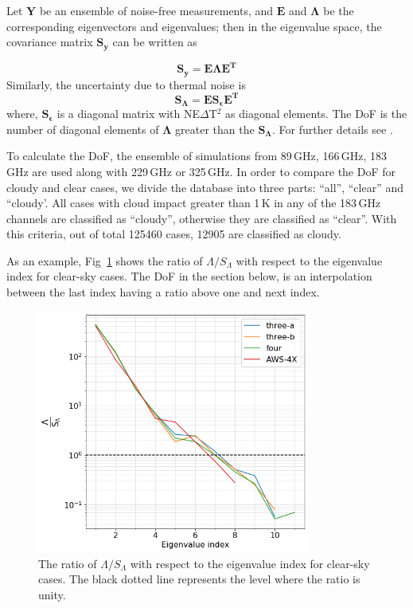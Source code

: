 \documentclass[12pt]{article}
\begin{document}
Let $\mathbf{Y}$ be an ensemble of noise-free measurements, and $\textbf{E}$
and $\mathbf{\Lambda}$ be the corresponding eigenvectors and eigenvalues; then
in the eigenvalue space, the covariance matrix $\mathbf{S_y}$ can be written as

\begin{equation}
\mathbf{S_y = E \Lambda E^T} 
\end{equation}
Similarly, the uncertainty due to thermal noise is
\begin{equation}
\mathbf{S_{\Lambda} = E S_{\epsilon} E^T }
\end{equation}
where, $\mathbf{S_{\epsilon}}$ is a diagonal matrix with NE$\Delta$T$^2$ as
diagonal elements. The DoF is the number of diagonal elements of
$\mathbf{\Lambda}$ greater than the $\mathbf{S_\Lambda}$. For further details
see \citet{eriksson:towar:20}.

To calculate the DoF, the ensemble of simulations from 89\,GHz, 166\,GHz,
183\,GHz are used along with 229\,GHz or 325\,GHz. In order to compare the DoF
for cloudy and clear cases, we divide the database into three parts: ``all'',
``clear'' and ``cloudy'. All cases with cloud impact greater than 1\,K in any
of the 183\,GHz channels are classified as ``cloudy'', otherwise they are
classified as ``clear''. With this criteria, out of total 125460 cases, 12905
are classified as cloudy.

As an example, Fig~\ref{fig:DoF:clear:1200K} shows the ratio of
$\Lambda/S_\Lambda$ with respect to the eigenvalue index for clear-sky cases.
The DoF in the section below, is an interpolation between the last index having a ratio above
one and next index.

\begin{figure}[!tb]
	\centering
	\includegraphics[height=80mm]{DoF.png}
	\caption{ The ratio of $\Lambda/S_\Lambda$ with
 respect to the eigenvalue
      index for clear-sky cases. The black dotted line represents the level
      where the ratio is unity. 
}
	\label{fig:DoF:clear:1200K}
\end{figure}
\end{document}
